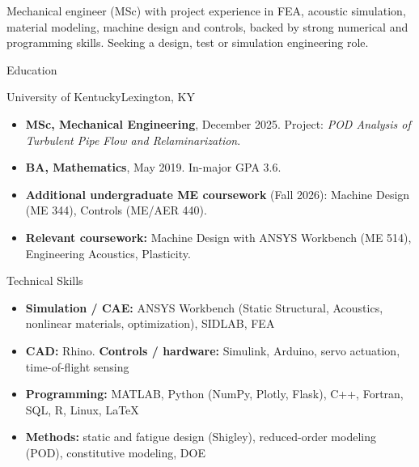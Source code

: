 \documentclass[]{mcdowellcv}
\begin{document}
\makeheader

Mechanical engineer (MSc) with project experience in FEA, acoustic simulation, material modeling, machine design
and controls, backed by strong numerical and programming skills. Seeking a design, test or simulation engineering role.

\begin{cvsection}{Education}
  \begin{cvsubsection}{University of Kentucky}{}{Lexington, KY}
    \begin{itemize}
      \item \textbf{MSc, Mechanical Engineering}, December 2025. Project: \textit{POD Analysis of Turbulent Pipe Flow and Relaminarization}.
      \item \textbf{BA, Mathematics}, May 2019. In-major GPA 3.6.
      \item \textbf{Additional undergraduate ME coursework} (Fall 2026): Machine Design (ME 344), Controls (ME/AER 440).
      \item \textbf{Relevant coursework:} Machine Design with ANSYS Workbench (ME 514), Engineering Acoustics, Plasticity.
    \end{itemize}
  \end{cvsubsection}
\end{cvsection}

\begin{cvsection}{Technical Skills}
  \begin{cvsubsection}{}{}{}
  \begin{itemize}
    \item \textbf{Simulation / CAE:} ANSYS Workbench (Static Structural, Acoustics, nonlinear materials, optimization), SIDLAB, FEA
    \item \textbf{CAD:} Rhino. \textbf{Controls / hardware:} Simulink, Arduino, servo actuation, time-of-flight sensing
    \item \textbf{Programming:} MATLAB, Python (NumPy, Plotly, Flask), C++, Fortran, SQL, R, Linux, LaTeX
    \item \textbf{Methods:} static and fatigue design (Shigley), reduced-order modeling (POD), constitutive modeling, DOE
  \end{itemize}
  \end{cvsubsection}
\end{cvsection}
\end{document}
